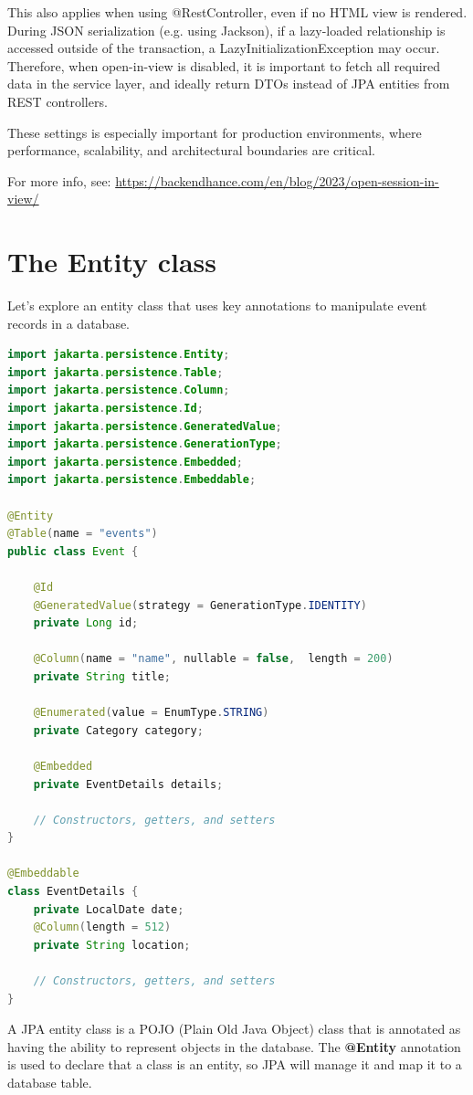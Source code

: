 \begin{itemize}
This also applies when using @RestController, even if no HTML view is rendered.
During JSON serialization (e.g. using Jackson), if a lazy-loaded relationship is accessed outside of the transaction, a LazyInitializationException may occur.
Therefore, when open-in-view is disabled, it is important to fetch all required data in the service layer, and ideally return DTOs instead of JPA entities from REST controllers.
\end{itemize}

These settings is especially important for production environments, where performance, scalability, and architectural boundaries are critical.

For more info, see:
\url{https://backendhance.com/en/blog/2023/open-session-in-view/}


\section{The Entity class}

Let's explore an entity class that uses key annotations to manipulate event records in a database.

\begin{lstlisting}[frame=single,language=java]
import jakarta.persistence.Entity;
import jakarta.persistence.Table;
import jakarta.persistence.Column;
import jakarta.persistence.Id;
import jakarta.persistence.GeneratedValue;
import jakarta.persistence.GenerationType;
import jakarta.persistence.Embedded;
import jakarta.persistence.Embeddable;

@Entity
@Table(name = "events")
public class Event {

    @Id
    @GeneratedValue(strategy = GenerationType.IDENTITY)
    private Long id;

    @Column(name = "name", nullable = false,  length = 200)
    private String title;
    
    @Enumerated(value = EnumType.STRING)
    private Category category;

    @Embedded
    private EventDetails details;

    // Constructors, getters, and setters
}

@Embeddable
class EventDetails {
    private LocalDate date;
    @Column(length = 512)
    private String location;

    // Constructors, getters, and setters
}
\end{lstlisting}

A JPA entity class is a POJO (Plain Old Java Object) class  that is annotated as having the ability to represent objects in the database.
The \textbf{@Entity} annotation is used to declare that a class is an entity, so JPA will manage it and map it to a database table.

